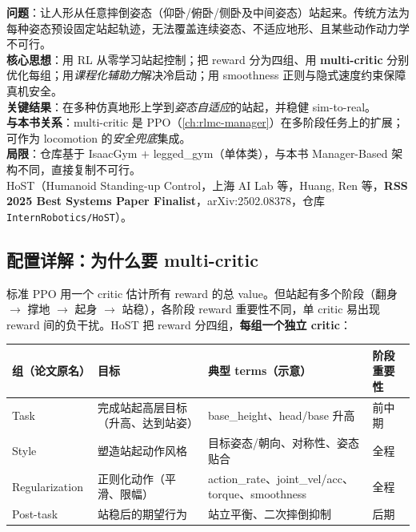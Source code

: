 \begin{paper}\label{paper:rlmc-hl-host}
\textbf{问题}：让人形从任意摔倒姿态（仰卧/俯卧/侧卧及中间姿态）站起来。传统方法为每种姿态预设固定站起轨迹，无法覆盖连续姿态、不适应地形、且某些动作动力学不可行。\\
\textbf{核心思想}：用 RL 从零学习站起控制；把 reward 分为四组、用 \textbf{multi-critic} 分别优化每组；用\emph{课程化辅助力}解决冷启动；用 smoothness 正则与隐式速度约束保障真机安全。\\
\textbf{关键结果}：在多种仿真地形上学到\emph{姿态自适应}的站起，并稳健 sim-to-real。\\
\textbf{与本书关系}：multi-critic 是 PPO（\cref{ch:rlmc-manager}）在多阶段任务上的扩展；可作为 locomotion 的\emph{安全兜底}集成。\\
\textbf{局限}：仓库基于 IsaacGym $+$ legged\_gym（单体类），与本书 Manager-Based 架构不同，直接复制不可行。\\
HoST（Humanoid Standing-up Control，上海 AI Lab 等，Huang, Ren 等，\textbf{RSS 2025 Best Systems Paper Finalist}，arXiv:2502.08378，仓库 \texttt{InternRobotics/\allowbreak HoST}）\cite{huang2025host}。
\end{paper}

\subsection{配置详解：为什么要 multi-critic}
标准 PPO 用一个 critic 估计所有 reward 的总 value。但站起有多个阶段（翻身 $\to$ 撑地 $\to$ 起身 $\to$ 站稳），各阶段 reward 重要性不同，单 critic 易出现 reward 间的负干扰。HoST 把 reward 分四组，\textbf{每组一个独立 critic}：

\begin{center}
\small
\begin{tabular}{p{2.0cm}p{3.2cm}p{4.6cm}p{1.6cm}}
\hline
组（论文原名） & 目标 & 典型 terms（示意） & 阶段重要性 \\
\hline
Task & 完成站起高层目标（升高、达到站姿） & base\_height、head/base 升高 & 前中期 \\
Style & 塑造站起动作风格 & 目标姿态/朝向、对称性、姿态贴合 & 全程 \\
Regularization & 正则化动作（平滑、限幅） & action\_rate、joint\_vel/acc、torque、smoothness & 全程 \\
Post-task & 站稳后的期望行为 & 站立平衡、二次摔倒抑制 & 后期 \\
\hline
\end{tabular}
\end{center}

